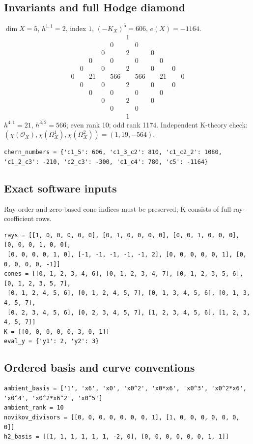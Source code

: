 \documentclass[10pt,a4paper]{article}
\begin{document}
\subsection*{Invariants and full Hodge diamond}
$\dim X=5$, $h^{1,1}=2$, index $1$, $(-K_X)^5=606$, $e(X)=-1164$.
\[\begin{array}{ccccccccccc}&&&&&1&&&&&\\&&&&0&&0&&&&\\&&&0&&2&&0&&&\\&&0&&0&&0&&0&&\\&0&&0&&2&&0&&0&\\0&&21&&566&&566&&21&&0\\&0&&0&&2&&0&&0&\\&&0&&0&&0&&0&&\\&&&0&&2&&0&&&\\&&&&0&&0&&&&\\&&&&&1&&&&&\end{array}\]
$h^{4,1}=21$, $h^{3,2}=566$; even rank 10; odd rank 1174.
Independent K-theory check: $(\chi(\mathcal O_X),\chi(\Omega_X^1),\chi(\Omega_X^2))=(1, 19, -564)$.
\begin{lstlisting}
chern_numbers = {'c1_5': 606, 'c1_3_c2': 810, 'c1_c2_2': 1080, 'c1_2_c3': -210, 'c2_c3': -300, 'c1_c4': 780, 'c5': -1164}
\end{lstlisting}
\subsection*{Exact software inputs}
Ray order and zero-based cone indices must be preserved; K consists of full ray-coefficient rows.
\begin{lstlisting}
rays = [[1, 0, 0, 0, 0, 0], [0, 1, 0, 0, 0, 0], [0, 0, 1, 0, 0, 0], [0, 0, 0, 1, 0, 0],
 [0, 0, 0, 0, 1, 0], [-1, -1, -1, -1, -1, 2], [0, 0, 0, 0, 0, 1], [0, 0, 0, 0, 0, -1]]
cones = [[0, 1, 2, 3, 4, 6], [0, 1, 2, 3, 4, 7], [0, 1, 2, 3, 5, 6], [0, 1, 2, 3, 5, 7],
 [0, 1, 2, 4, 5, 6], [0, 1, 2, 4, 5, 7], [0, 1, 3, 4, 5, 6], [0, 1, 3, 4, 5, 7],
 [0, 2, 3, 4, 5, 6], [0, 2, 3, 4, 5, 7], [1, 2, 3, 4, 5, 6], [1, 2, 3, 4, 5, 7]]
K = [[0, 0, 0, 0, 0, 3, 0, 1]]
eval_y = {'y1': 2, 'y2': 3}
\end{lstlisting}
\subsection*{Ordered basis and curve conventions}
\begin{lstlisting}
ambient_basis = ['1', 'x6', 'x0', 'x0^2', 'x0*x6', 'x0^3', 'x0^2*x6', 'x0^4', 'x0^2*x6^2', 'x0^5']
ambient_rank = 10
novikov_divisors = [[0, 0, 0, 0, 0, 0, 0, 1], [1, 0, 0, 0, 0, 0, 0, 0]]
h2_basis = [[1, 1, 1, 1, 1, 1, -2, 0], [0, 0, 0, 0, 0, 0, 1, 1]]
\end{lstlisting}
\end{document}
